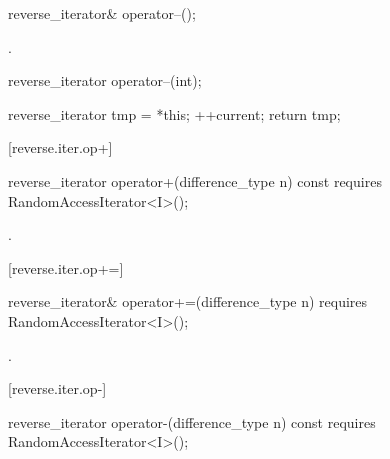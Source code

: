 %
\begin{itemdecl}
reverse_iterator& operator--();
\end{itemdecl}

\begin{itemdescr}
\pnum
\effects
{}

\pnum
\returns
{}.
\end{itemdescr}

%
%
\begin{itemdecl}
reverse_iterator operator--(int);
\end{itemdecl}

\begin{itemdescr}
\pnum
\effects
\begin{codeblock}
reverse_iterator tmp = *this;
++current;
return tmp;
\end{codeblock}
\end{itemdescr}

[reverse.iter.op+]{}

%
\begin{itemdecl}
reverse_iterator
  operator+(difference_type n) const
    requires RandomAccessIterator<I>();
\end{itemdecl}

\begin{itemdescr}
\pnum
\returns
{}.
\end{itemdescr}

[reverse.iter.op+=]{}

%
\begin{itemdecl}
reverse_iterator&
  operator+=(difference_type n)
    requires RandomAccessIterator<I>();
\end{itemdecl}

\begin{itemdescr}
\pnum
\effects
{}

\pnum
\returns
{}.
\end{itemdescr}

[reverse.iter.op-]{}

%
\begin{itemdecl}
reverse_iterator
  operator-(difference_type n) const
    requires RandomAccessIterator<I>();
\end{itemdecl}

